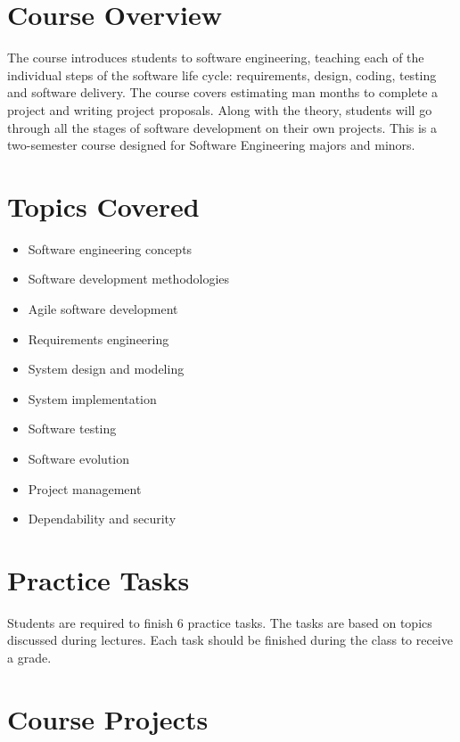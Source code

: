 \documentclass[12pt,a4paper,oneside]{article}
\begin{document}
    \section{Course Overview}

        The course introduces students to software engineering, teaching each of
        the individual steps of the software life cycle: requirements, design,
        coding, testing and software delivery. The course covers estimating man
        months to complete a project and writing project proposals. Along with
        the theory, students will go through all the stages of software
        development on their own projects. This is a two-semester course
        designed for Software Engineering majors and minors.

    \section{Topics Covered}

        \begin{itemize}
            \item Software engineering concepts
            \item Software development methodologies
            \item Agile software development
            \item Requirements engineering
            \item System design and modeling
            \item System implementation
            \item Software testing
            \item Software evolution
            \item Project management
            \item Dependability and security
        \end{itemize}

    \section{Practice Tasks}

        Students are required to finish 6 practice tasks. The tasks are based on
        topics discussed during lectures. Each task should be finished during
        the class to receive a grade.

    \section{Course Projects}
\end{document}
